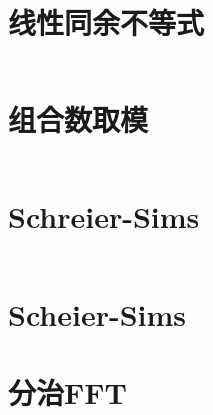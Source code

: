 \section{线性同余不等式}
\inputminted{cpp}{\source/number-theory/linear-inequaltion.cpp}
\section{组合数取模}
\inputminted{cpp}{\source/number-theory/module.cpp}
\section{Schreier-Sims}
\inputminted{cpp}{\source/number-theory/Schreier-Sims.cpp}
\section{Scheier-Sims}
\section{分治FFT}
\inputminted{cpp}{\source/number-theory/cdq-fft.cpp}
